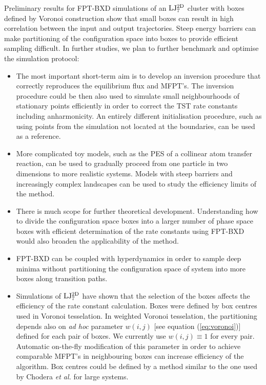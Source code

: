 Preliminary results for FPT-BXD simulations of an ${\rm LJ_7^{2D}}$ cluster with boxes defined by Voronoi construction show that small boxes can result in high correlation between the input and output trajectories.
Steep energy barriers can make partitioning of the configuration space into boxes to provide efficient sampling difficult.
In further studies, we plan to further benchmark and optimise the simulation protocol:
\begin{itemize}

\item The most important short-term aim is to develop an inversion procedure that correctly reproduces the equilibrium flux and MFPT's. The inversion procedure could be then also used to simulate small neighbourhoods of stationary points efficiently in order to correct the TST rate constants including anharmonicity. An entirely different initialisation procedure, such as using points from the simulation not located at the boundaries, can be used as a reference.

\item More complicated toy models, such as the PES of a collinear atom transfer reaction,\cite{Secrest1966} can be used to gradually proceed from one particle in two dimensions to more realistic systems. Models with steep barriers and increasingly complex landscapes can be used to study the efficiency limits of the method.

\item There is much scope for further theoretical development. Understanding how to divide the configuration space boxes into a larger number of phase space boxes with efficient determination of the rate constants using FPT-BXD would also broaden the applicability of the method.

\item FPT-BXD can be coupled with hyperdynamics\cite{Voter1997} in order to sample deep minima without partitioning the configuration space of system into more boxes along transition paths.

\item Simulations of ${\rm LJ_7^{2D}}$ have shown that the selection of the boxes affects the efficiency of the rate constant calculation. Boxes were defined by box centres used in Voronoi tesselation. In weighted Voronoi tesselation, the partitioning depends also on {\it ad hoc} parameter $w(i,j)$ [see equation (\ref{eq:voronoi})] defined for each pair of boxes. We currently use $w(i,j) \equiv 1$ for every pair. Automatic on-the-fly modification of this parameter in order to achieve comparable MFPT's in neighbouring boxes can increase efficiency of the algorithm. Box centres could be defined by a method similar to the one used by Chodera {\it et al.}\cite{Chodera2007} for large systems.

\end{itemize}

